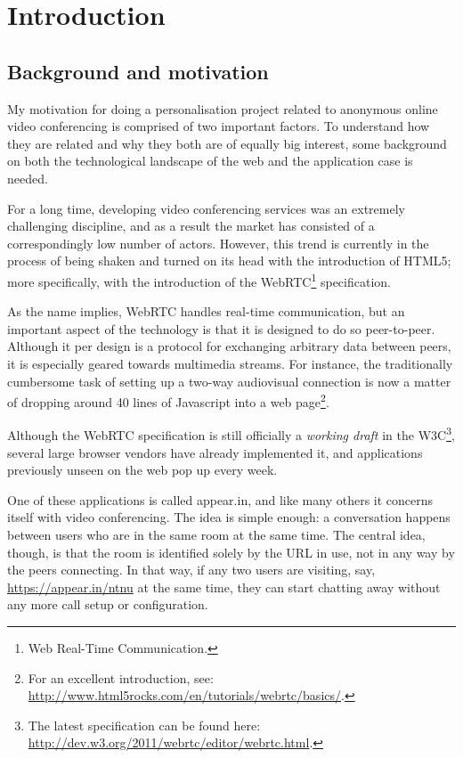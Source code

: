 \chapter{Introduction}

\label{Chapter1}



\section{Background and motivation}
\label{sec:motivation}

My motivation for doing a personalisation project related to anonymous online video conferencing is comprised of two important factors. To understand how they are related and why they both are of equally big interest, some background on both the technological landscape of the web and the application case is needed.

For a long time, developing video conferencing services was an extremely challenging discipline, and as a result the market has consisted of a correspondingly low number of actors. However, this trend is currently in the process of being shaken and turned on its head with the introduction of HTML5; more specifically, with the introduction of the WebRTC\footnote{Web Real-Time Communication.} specification.

As the name implies, WebRTC handles real-time communication, but an important aspect of the technology is that it is designed to do so peer-to-peer. Although it per design is a protocol for exchanging arbitrary data between peers, it is especially geared towards multimedia streams. For instance, the traditionally cumbersome task of setting up a two-way audiovisual connection is now a matter of dropping around 40 lines of Javascript into a web page\footnote{For an excellent introduction, see: \url{http://www.html5rocks.com/en/tutorials/webrtc/basics/}.}.

Although the WebRTC specification is still officially a \emph{working draft} in the W3C\footnote{The latest specification can be found here: \url{http://dev.w3.org/2011/webrtc/editor/webrtc.html}.}, several large browser vendors have already implemented it, and applications previously unseen on the web pop up every week.

One of these applications is called appear.in, and like many others it concerns itself with video conferencing. The idea is simple enough: a conversation happens between users who are in the same room at the same time. The central idea, though, is that the room is identified solely by the URL in use, not in any way by the peers connecting. In that way, if any two users are visiting, say, \url{https://appear.in/ntnu} at the same time, they can start chatting away without any more call setup or configuration.

